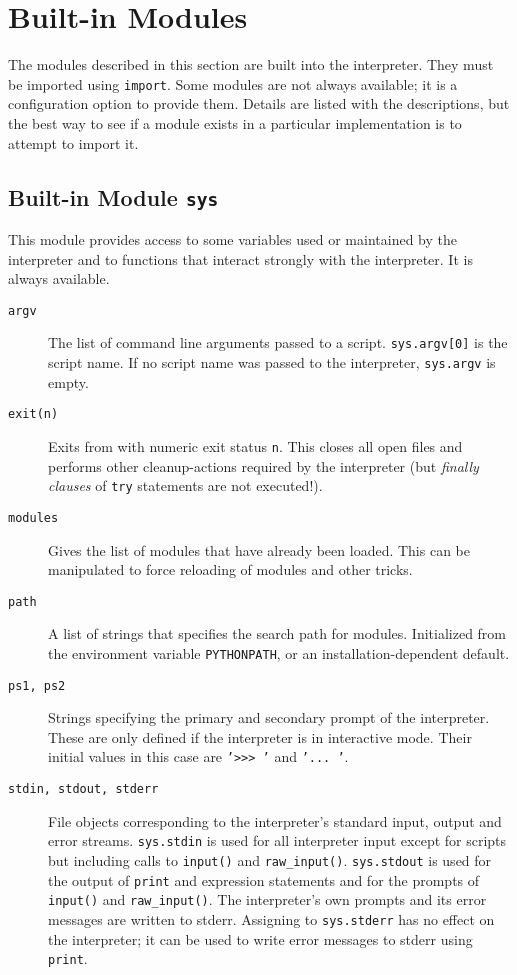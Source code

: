 \section{Built-in Modules}

The modules described in this section are built into the interpreter.
They must be imported using
{\tt import}.
Some modules are not always available; it is a configuration option to
provide them.
Details are listed with the descriptions, but the best way to see if
a module exists in a particular implementation is to attempt to import
it.

\subsection{Built-in Module {\tt sys}}

This module provides access to some variables used or maintained by the
interpreter and to functions that interact strongly with the interpreter.
It is always available.
\begin{description}
\item[{\tt argv}]
The list of command line arguments passed to a {\Python} script.
{\tt sys.argv[0]}
is the script name.
If no script name was passed to the {\Python} interpreter,
{\tt sys.argv}
is empty.
\item[{\tt exit(n)}]
Exits from {\Python} with numeric exit status
{\tt n}.
This closes all open files and performs other cleanup-actions required by
the interpreter (but
{\em finally clauses}
of
{\tt try}
statements are not executed!).
\item[{\tt modules}]
Gives the list of modules that have already been loaded.
This can be manipulated to force reloading of modules and other tricks.
\item[{\tt path}]
A list of strings that specifies the search path for modules.
Initialized from the environment variable {\tt PYTHONPATH}, or an
installation-dependent default.
\item[{\tt ps1,~ps2}]
Strings specifying the primary and secondary prompt of the interpreter.
These are only defined if the interpreter is in interactive mode.
Their initial values in this case are
{\tt '>>> '}
and
{\tt '... '}.
\item[{\tt stdin, stdout, stderr}]
File objects corresponding to the interpreter's standard input, output
and error streams.
{\tt sys.stdin}
is used for all interpreter input except for scripts but including calls
to
{\tt input()}
and
{\tt raw\_input()}.
{\tt sys.stdout}
is used for the output of
{\tt print} and expression statements
and for the prompts of
{\tt input()}
and
{\tt raw\_input()}.
The interpreter's own prompts and its error messages are written to
stderr.
Assigning to
{\tt sys.stderr}
has no effect on the interpreter; it can be used to write error messages
to stderr using
{\tt print}.
\end{description}

